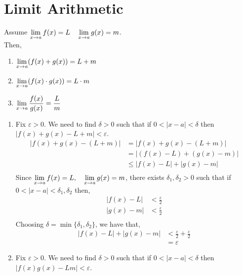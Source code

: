 \documentclass[12pt]{article}
\begin{document}
\section{Limit Arithmetic}
\begin{theo}{}
Assume \(\displaystyle\lim_{x\to a}f(x) = L \quad \displaystyle\lim_{x\to a}g(x) = m\).\\
Then,
\begin{enumerate}
    \item \(\displaystyle\lim_{x\to a}(f(x) + g(x)) = L + m\)
    \item \(\displaystyle\lim_{x\to a}(f(x)\cdot g(x)) = L\cdot m\)
    \item \(\displaystyle\lim_{x\to a}\frac{f(x)}{g(x)} = \frac{L}{m}\)\\
\end{enumerate}    
\end{theo}
\begin{prf}{}
\begin{enumerate}
    \item Fix \(\varepsilon > 0\). We need to find \(\delta > 0\) such that if \(0 < |x - a| < \delta\) then \(|f(x)+ g(x) - L + m| < \varepsilon\).\\
    \begin{align*}
        |f(x) + g(x) - (L + m)| &= |f(x) + g(x)  - (L + m)|\\
        &= |(f(x) - L) + (g(x) - m)|\\
        &\le |f(x) - L| + |g(x) - m|\\
    \end{align*}
    Since \(\displaystyle\lim_{x\to a}f(x) = L, \quad \displaystyle\lim_{x\to a}g(x) = m\), there exists \(\delta_1, \delta_2 > 0\) such that if \(0 < |x - a| < \delta_1, \delta_2\) then, 
    \begin{align*}
        |f(x) - L| &< \frac{\varepsilon}{2}\\
        |g(x) - m| &< \frac{\varepsilon}{2}\\
    \end{align*}
    Choosing \(\delta = \min\{\delta_1, \delta_2\}\), we have that,
    \begin{align*}
    |f(x) - L| + |g(x) - m|  &< \frac{\varepsilon}{2} + \frac{\varepsilon}{2}\\
    &= \varepsilon
    \end{align*}
    \item Fix \(\varepsilon > 0\). We need to find \(\delta > 0\) such that if \(0 < |x - a| < \delta\) then \(|f(x)g(x) - Lm| < \varepsilon\).\\
    \begin{align*}

\end{align*}
\end{enumerate}
\end{prf}
\end{document}
